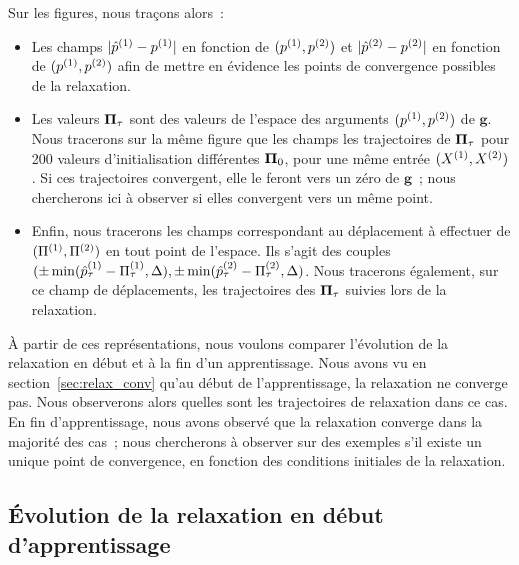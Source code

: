 \documentclass[../main]{subfiles}
\begin{document}
Sur les figures, nous traçons alors~:

\begin{itemize}
\item Les champs $\lvert \hat{p}^{({1})} - p^{({1})} \rvert$ en fonction de $(p^{({1})}, p^{({2})})$ et $\lvert \hat{p}^{({2})} - p^{({2})} \rvert$ en fonction de $(p^{({1})}, p^{({2})})$ afin de mettre en évidence les points de convergence possibles de la relaxation. 
\item Les valeurs $\mathbf{\Pi}_\tau$ sont des valeurs de l'espace des arguments $(p^{({1})}, p^{({2})})$ de $\mathbf{g}$. Nous tracerons sur la même figure que les champs les trajectoires de $\mathbf{\Pi}_\tau$ pour 200 valeurs d'initialisation différentes $\mathbf{\Pi}_0$, pour une même entrée $(X^{({1})}, X^{({2})})$. Si ces trajectoires convergent, elle le feront vers un zéro de $\mathbf{g}$~; nous chercherons ici à observer si elles convergent vers un même point.
\item Enfin, nous tracerons les champs correspondant au déplacement à effectuer de $(\Pi^{({1})},\Pi^{({2})})$ en tout point de l'espace. Ils s'agit des couples $(\pm \min(\hat{p}^{({1})}_\tau - \Pi^{({1})}_\tau, \Delta), \pm \min(\hat{p}^{({2})}_\tau - \Pi^{({2})}_\tau, \Delta)$. Nous tracerons également, sur ce champ de déplacements, les trajectoires des $\mathbf{\Pi}_\tau$ suivies lors de la relaxation.
\end{itemize}

\`A partir de ces représentations, nous voulons comparer l'évolution de la relaxation en début et à la fin d'un apprentissage. 
Nous avons vu en section~\ref{sec:relax_conv} qu'au début de l'apprentissage, la relaxation ne converge pas. Nous observerons alors quelles sont les trajectoires de relaxation dans ce cas.
En fin d'apprentissage, nous avons observé que la relaxation converge dans la majorité des cas~; nous chercherons à observer sur des exemples s'il existe un unique point de convergence, en fonction des conditions initiales de la relaxation.

\subsection{\'Evolution de la relaxation en début d'apprentissage}
\end{document}
